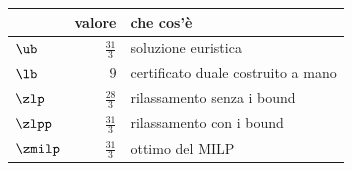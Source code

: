 \begin{center}\small
\begin{tabular}{lrl}
\toprule
 & valore & che cos'è \\
\midrule
$\ub$ & $\frac{31}{3}$ & soluzione euristica \\
$\lb$ & $9$ & certificato duale costruito a mano \\
$\zlp$ & $\frac{28}{3}$ & rilassamento senza i bound \\
$\zlpp$ & $\frac{31}{3}$ & rilassamento con i bound \\
$\zmilp$ & $\frac{31}{3}$ & ottimo del MILP \\
\bottomrule
\end{tabular}
\end{center}

